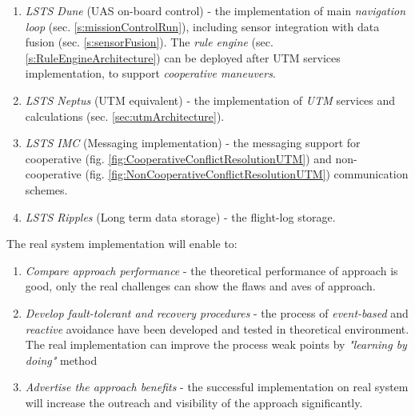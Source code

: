 \begin{enumerate}
    \item \emph{LSTS Dune} (UAS on-board control) - the implementation of main \emph{navigation loop} (sec. \ref{s:missionControlRun}), including sensor integration with data fusion (sec. \ref{s:sensorFusion}). The \emph{rule engine} (sec. \ref{s:RuleEngineArchitecture}) can be deployed after UTM services implementation, to support \emph{cooperative maneuvers}.
    
    \item \emph{LSTS Neptus} (UTM equivalent) - the implementation of \emph{UTM} services and calculations (sec. \ref{sec:utmArchitecture}).
    
    \item \emph{LSTS IMC} (Messaging implementation) -  the messaging support for cooperative (fig. \ref{fig:CooperativeConflictResolutionUTM}) and non-cooperative (fig. \ref{fig:NonCooperativeConflictResolutionUTM}) communication schemes.
    
    \item \emph{LSTS Ripples} (Long term data storage) -  the flight-log storage.
    
\end{enumerate}

\noindent The real system implementation will enable to:
\begin{enumerate}
    \item \emph{Compare approach performance} - the theoretical performance of approach is good, only the real challenges can show the flaws and aves of approach. 
    
    \item \emph{Develop fault-tolerant and recovery procedures} - the process of \emph{event-based} and \emph{reactive} avoidance have been developed and tested in theoretical environment. The real implementation can improve the process weak points by \emph{"learning by doing"} method
    
    \item \emph{Advertise the approach benefits} - the successful implementation on real system will increase the outreach and visibility of the approach significantly.
\end{enumerate}